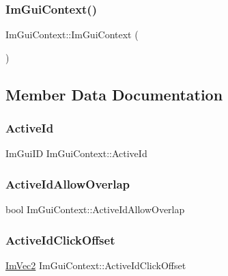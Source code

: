 \subsubsection{\texorpdfstring{Im\+Gui\+Context()}{ImGuiContext()}}
{\footnotesize\ttfamily Im\+Gui\+Context\+::\+Im\+Gui\+Context (\begin{DoxyParamCaption}{ }\end{DoxyParamCaption})}



\subsection{Member Data Documentation}
\hypertarget{struct_im_gui_context_a11c874eb6cf74ba9162bd1d01c4ccbcc}{}\label{struct_im_gui_context_a11c874eb6cf74ba9162bd1d01c4ccbcc} 
\subsubsection{\texorpdfstring{Active\+Id}{ActiveId}}
{\footnotesize\ttfamily Im\+Gui\+ID Im\+Gui\+Context\+::\+Active\+Id}

\hypertarget{struct_im_gui_context_ab3234556023eabcfed157b79ba4c5869}{}\label{struct_im_gui_context_ab3234556023eabcfed157b79ba4c5869} 
\subsubsection{\texorpdfstring{Active\+Id\+Allow\+Overlap}{ActiveIdAllowOverlap}}
{\footnotesize\ttfamily bool Im\+Gui\+Context\+::\+Active\+Id\+Allow\+Overlap}

\hypertarget{struct_im_gui_context_a28afb4e9b4ac155825f4b4c94cdc516c}{}\label{struct_im_gui_context_a28afb4e9b4ac155825f4b4c94cdc516c} 
\subsubsection{\texorpdfstring{Active\+Id\+Click\+Offset}{ActiveIdClickOffset}}
{\footnotesize\ttfamily \hyperlink{struct_im_vec2}{Im\+Vec2} Im\+Gui\+Context\+::\+Active\+Id\+Click\+Offset}


